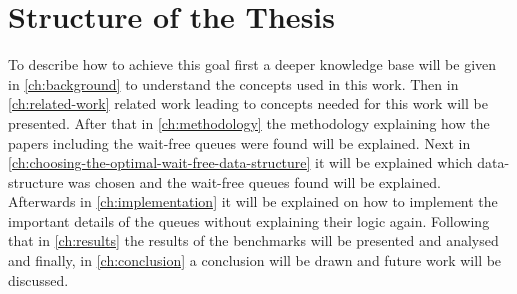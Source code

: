 \section{Structure of the Thesis}\label{sec:structure-of-the-thesis}
To describe how to achieve this goal first a deeper knowledge base will be given in \cref{ch:background} to understand the concepts used in this work. Then in \cref{ch:related-work} related work leading to concepts needed for this work will be presented. After that in \cref{ch:methodology} the methodology explaining how the papers including the wait-free queues were found will be explained. Next in \cref{ch:choosing-the-optimal-wait-free-data-structure} it will be explained which data-structure was chosen and the wait-free queues found will be explained. Afterwards in \cref{ch:implementation} it will be explained on how to implement the important details of the queues without explaining their logic again. Following that in \cref{ch:results} the results of the benchmarks will be presented and analysed and finally, in \cref{ch:conclusion} a conclusion will be drawn and future work will be discussed.